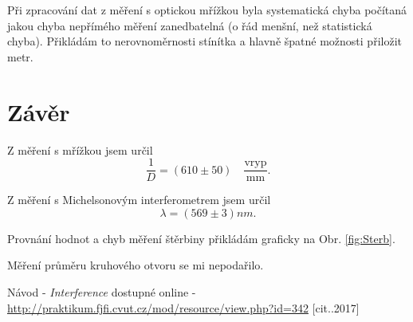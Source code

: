   Při zpracování dat z měření s optickou mřížkou byla systematická chyba počítaná jakou chyba nepřímého měření zanedbatelná (o řád menšní, než statistická chyba). Přikládám to nerovnoměrnosti stínítka a hlavně špatné možnosti přiložit metr.



\section{Závěr} %
\label{sec:z_v_r}
Z měření s mřížkou jsem určil
\begin{equation}
			\frac 1 D = (610 \pm 50)  \quad \frac{\textrm{vryp}} {\textrm{mm}}.
		\end{equation}

Z měření s Michelsonovým interferometrem jsem určil
\begin{equation}
			\lambda = (569 \pm 3) nm.
		\end{equation}

		Provnání hodnot a chyb měření štěrbiny přikládám graficky na Obr. \ref{fig:Sterb}.

		Měření průměru kruhového otvoru se mi nepodařilo.




\begin{thebibliography}{99}
 Návod - \emph{Interference} dostupné online - \url {http://praktikum.fjfi.cvut.cz/mod/resource/view.php?id=342} [cit..2017]



\end{thebibliography}





